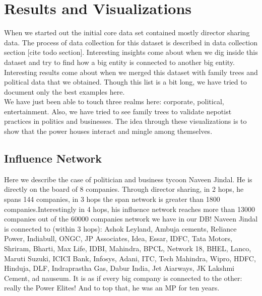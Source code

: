 \chapter{Results and Visualizations}

When we started out the initial core data set contained mostly director sharing data. The process of data collection for this dataset is described in data collection section [cite todo section]. Interesting insights come about when we dig inside this dataset and try to find how a big entity is connected to another big entity. \\

Interesting results come about when we merged this dataset with family trees and political data that we obtained. Though this list is a bit long, we have tried to document only the best examples here. \\

We have just been able to touch three realms here: corporate, political, entertainment.
Also, we have tried to see family trees to validate nepotist practices in politics and businesses. The idea through these visualizations is to show that the power houses interact and mingle among themselves. \\


\section{Influence Network}

Here we describe the case of politician and business tycoon Naveen Jindal. He is directly on the board of 8 companies. Through director sharing, in 2 hops, he spans 144 companies, in 3 hops the span network is greater than 1800 companies.Interestingly in 4 hops, his influence network reaches more than 13000 companies out of the 60000 companies network we have in our DB!  Naveen Jindal is connected to (within 3 hops): Ashok Leyland, Ambuja cements, Reliance Power, Indiabull, ONGC, JP Associates, Idea, Essar, IDFC, Tata Motors, Shriram, Bharti, Max Life, IDBI, Mahindra, BPCL, Network 18, BHEL, Lanco, Maruti Suzuki, ICICI Bank, Infosys, Adani, ITC, Tech Mahindra, Wipro, HDFC, Hinduja, DLF, Indraprastha Gas, Dabur India, Jet Aiarways, JK Lakshmi Cement, ad nauseum. It is as if every big company is connected to the other: really the Power Elites! And to top that, he was an MP for ten years.


